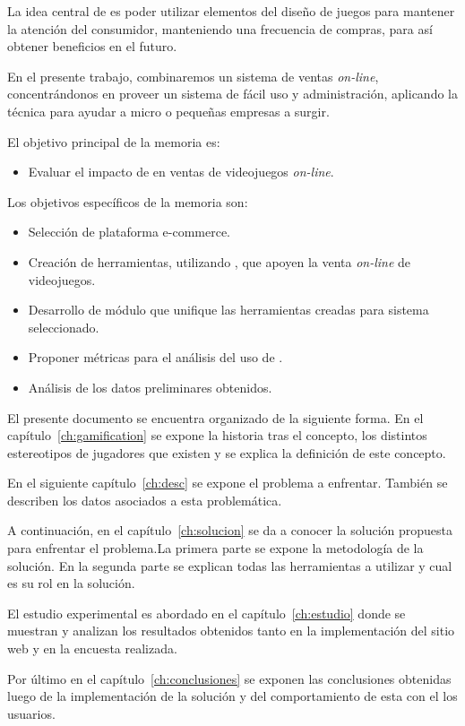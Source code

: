 La idea central de  {\GAM} es poder utilizar elementos del diseño de juegos
para mantener la atención del consumidor, manteniendo una frecuencia de compras,
para así obtener beneficios en el futuro.

En el presente trabajo, combinaremos un sistema de ventas \emph{on-line}, concentrándonos
en proveer un sistema de fácil uso y administración, aplicando la técnica {\GAM}
para ayudar a micro o pequeñas empresas a surgir.

El objetivo principal de la memoria es:

\begin{itemize}
    \item Evaluar el impacto de {\GAM} en ventas de videojuegos \emph{on-line}.
\end{itemize}

Los objetivos específicos de la memoria son:
\begin{itemize}
    \item Selección de plataforma e-commerce.
    \item Creación de herramientas, utilizando {\GAM}, que apoyen la
          venta \emph{on-line} de videojuegos.
    \item Desarrollo de módulo que unifique las herramientas creadas para sistema
          seleccionado.
    \item Proponer métricas para el análisis del uso de {\GAM}.
    \item Análisis de los datos preliminares obtenidos.
\end{itemize}

El presente documento se encuentra organizado de la siguiente forma.
En el capítulo~\ref{ch:gamification} se expone la historia tras
el concepto, los distintos estereotipos de jugadores que existen y 
se explica la definición de este concepto.

En el siguiente capítulo~\ref{ch:desc} se expone el problema a enfrentar.
También se describen los datos asociados a esta problemática.

A continuación, en el capítulo~\ref{ch:solucion} se da a conocer la solución
propuesta para enfrentar el problema.La primera parte se expone la metodología
de la solución. En la segunda parte se explican todas las herramientas a utilizar
 y cual es su rol en la solución.

El estudio experimental es abordado en el capítulo~\ref{ch:estudio} donde
se muestran y analizan los resultados obtenidos tanto en la implementación
del sitio web y en la encuesta realizada.

Por último en el capítulo~\ref{ch:conclusiones} se exponen las conclusiones
obtenidas luego de la implementación de la solución y del comportamiento de esta
con el los usuarios.
